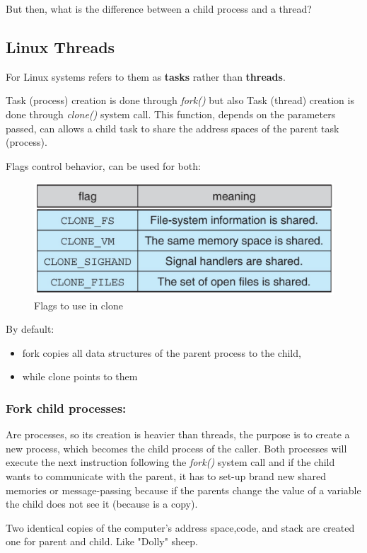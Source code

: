 But then, what is the difference between a child process and a thread?

\subsection{Linux Threads}
For Linux systems refers to them as \textbf{tasks} rather than \textbf{threads}.

Task (process) creation is done through \textit{fork()} but also Task (thread) creation is done through \textit{clone()} system call. This function, depends on the parameters passed, can allows a child task to share the address spaces of the parent task (process).

Flags control behavior, can be used for both:

\begin{figure}[htbp]
    \centering
    \includegraphics[width=0.55\linewidth]{img/flags.png}
    \caption{Flags to use in clone}    
\end{figure}

\newpage
By default:
\begin{itemize}
    \item fork copies all data structures of the parent process to the child,
    \item while clone points to them
\end{itemize}

\subsubsection{Fork child processes:}
Are processes, so its creation is heavier than threads, the purpose is to create a new process, which becomes the child
process of the caller. Both processes will execute the next instruction following the \textit{fork()} system call and if the child wants to communicate with the parent, it has to set-up brand new shared memories or message-passing because if the parents change the value of a variable the child does not see it (because is a copy).

Two identical copies of the computer's address space,code, and stack are created one for parent and child. Like "Dolly" sheep.


